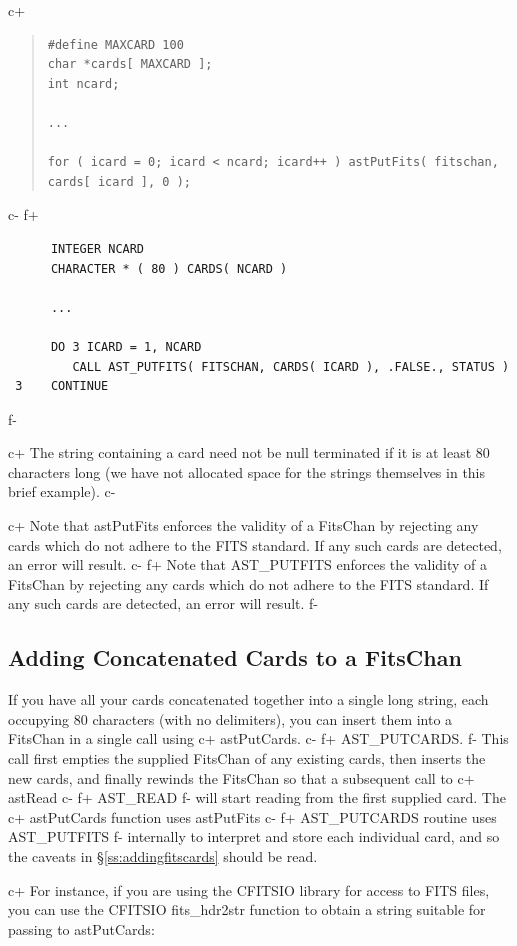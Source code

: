 \documentclass[twoside,11pt]{article}
\newcommand{\secref}[1]{\S\ref{#1}}
\newcommand{\secref}[1]{\ref{#1}}
\begin{document}
c+
\begin{quote}
\small
\begin{verbatim}
#define MAXCARD 100
char *cards[ MAXCARD ];
int ncard;

...

for ( icard = 0; icard < ncard; icard++ ) astPutFits( fitschan, cards[ icard ], 0 );
\end{verbatim}
\normalsize
\end{quote}
c-
f+
\small
\begin{verbatim}
      INTEGER NCARD
      CHARACTER * ( 80 ) CARDS( NCARD )

      ...

      DO 3 ICARD = 1, NCARD
         CALL AST_PUTFITS( FITSCHAN, CARDS( ICARD ), .FALSE., STATUS )
 3    CONTINUE
\end{verbatim}
\normalsize
f-

c+
The string containing a card need not be null terminated if it is at
least 80 characters long (we have not allocated space for the strings
themselves in this brief example).
c-

c+
Note that astPutFits enforces the validity of a FitsChan by rejecting
any cards which do not adhere to the FITS standard. If any such cards
are detected, an error will result.
c-
f+
Note that AST\_PUTFITS enforces the validity of a FitsChan by
rejecting any cards which do not adhere to the FITS standard. If any
such cards are detected, an error will result.
f-

\subsection{\label{ss:addingmulticards}Adding Concatenated Cards to a FitsChan}

If you have all your cards concatenated together into a single long string, 
each occupying 80 characters (with no delimiters), you can insert them
into a FitsChan in a single call using
c+
astPutCards.
c-
f+
AST\_PUTCARDS.
f-
This call first empties the supplied FitsChan of any existing cards, then 
inserts the new cards, and finally rewinds the FitsChan so that a
subsequent call to 
c+
astRead
c-
f+
AST\_READ
f-
will start reading from the first supplied card. The
c+
astPutCards function uses astPutFits
c-
f+
AST\_PUTCARDS routine uses AST\_PUTFITS
f-
internally to interpret and store each individual card, and so the
caveats in \secref{ss:addingfitscards} should be read.

c+
For instance, if you are using the CFITSIO library for access to FITS
files, you can use the CFITSIO fits\_hdr2str function to obtain a string suitable
for passing to astPutCards:
\end{document}
